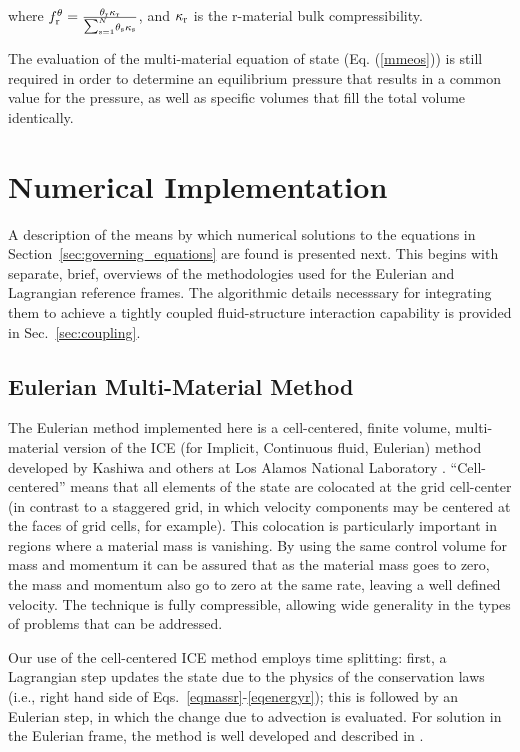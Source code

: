 where $f_\rmr^{\theta} = {{\theta_\rmr \kappa_\rmr} \over
{\raise1pt\hbox{${\scriptstyle\sum_{\rms =1}^N}$}} \theta_\rms\kappa_\rms}$,
and $\kappa_\rmr$ is the r-material bulk compressibility.

The evaluation of the multi-material equation of state (Eq. (\ref{mmeos}))
is still required in order to determine an equilibrium pressure that results
in a common value for the  pressure, as well as specific volumes that fill
the total volume identically.

\section{Numerical Implementation}\label{sec:numerical_algorithm}

A description of the means by which numerical solutions to the equations in
Section~\ref{sec:governing_equations} are found is presented next.  This begins
with separate, brief, overviews of the methodologies used for the Eulerian
and Lagrangian reference frames.  The algorithmic details necesssary for
integrating them to achieve a tightly coupled fluid-structure interaction
capability is provided in Sec.~\ref{sec:coupling}.


\subsection{Eulerian Multi-Material Method}\label{sec:EulerianMFM}

The Eulerian method implemented here is a cell-centered, finite volume,
multi-material version of the ICE (for Implicit, Continuous fluid, Eulerian)
method \cite{harlowamsden68} developed by Kashiwa and others at Los Alamos
National Laboratory \cite{kashiwaCCICE94}.  ``Cell-centered'' means that all
elements of the state are colocated at the grid cell-center (in contrast to
a staggered grid, in which velocity components may be centered at the faces
of grid cells, for example).  This colocation is particularly important
in regions where a material mass is vanishing.  By using the same control
volume for mass and momentum it can be assured that as the material mass goes
to zero, the mass and momentum also go to zero at the same rate, leaving a
well defined velocity.  The technique is fully compressible, allowing wide
generality in the types of problems that can be addressed.

 
Our use of the cell-centered ICE method employs time splitting: first,
a Lagrangian step updates the state due to the physics of the conservation
laws (i.e., right hand side of Eqs.~{\ref{eqmassr}-\ref{eqenergyr}}); this
is followed by an Eulerian step, in which the change due to advection is
evaluated.  For solution in the Eulerian frame, the method is well developed
and described in \cite{kashiwaCCICE94}.


